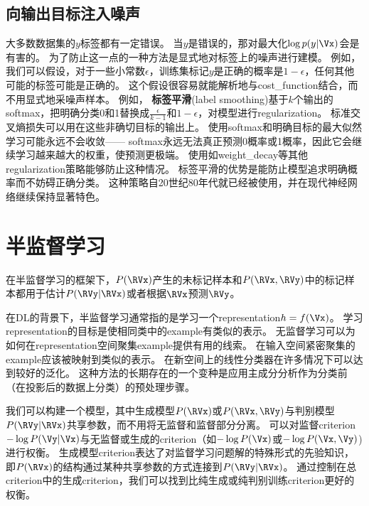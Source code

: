 \subsection{向输出目标注入噪声}
\label{sec:injecting_noise_at_the_output_targets}
大多数数据集的$y$标签都有一定错误。
当$y$是错误的，那对最大化$\log p(y | \Vx)$会是有害的。
为了防止这一点的一种方法是显式地对标签上的噪声进行建模。
例如，我们可以假设，对于一些小常数$\epsilon$，训练集标记$y$是正确的概率是$1-\epsilon$，任何其他可能的标签可能是正确的。
这个假设很容易就能解析地与\gls{cost_function}结合，而不用显式地采噪声样本。
例如， \textbf{标签平滑}(label smoothing)基于$k$个输出的\gls{softmax}，把明确分类0和1替换成$\frac{\epsilon}{k-1}$和$1-\epsilon$，对模型进行\gls{regularization}。
标准交叉熵损失可以用在这些非确切目标的输出上。
使用\gls{softmax}和明确目标的最大似然学习可能永远不会收敛——
\gls{softmax}永远无法真正预测0概率或1概率，因此它会继续学习越来越大的权重，使预测更极端。
使用如\gls{weight_decay}等其他\gls{regularization}策略能够防止这种情况。
标签平滑的优势是能防止模型追求明确概率而不妨碍正确分类。
这种策略自20世纪80年代就已经被使用，并在现代神经网络继续保持显著特色\citep{Szegedy-et-al-2015}。


\section{半监督学习}
\label{sec:semi_supervised_learning}
在半监督学习的框架下，$P(\RVx)$产生的未标记样本和$P(\RVx, \RVy)$中的标记样本都用于估计$P(\RVy | \RVx)$或者根据$\RVx$预测$\RVy$。

在\gls{DL}的背景下，半监督学习通常指的是学习一个\gls{representation}$h = f(\Vx)$。 
学习\gls{representation}的目标是使相同类中的\gls{example}有类似的表示。
无监督学习可以为如何在\gls{representation}空间聚集\gls{example}提供有用的线索。
在输入空间紧密聚集的\gls{example}应该被映射到类似的表示。
在新空间上的线性分类器在许多情况下可以达到较好的泛化\citep{Belkin+Niyogi-2002,Chapelle+al-2003}。
这种方法的长期存在的一个变种是应用主成分分析作为分类前（在投影后的数据上分类）的预处理步骤。

我们可以构建一个模型，其中生成模型$P(\RVx)$或$P(\RVx, \RVy)$与判别模型$P(\RVy | \RVx)$共享参数，而不用将无监督和监督部分分离。
可以对监督\gls{criterion}$-\log P(\Vy | \Vx)$与无监督或生成的\gls{criterion}（如$-\log P(\Vx)$或$-\log P(\Vx, \Vy)$)进行权衡。
生成模型\gls{criterion}表达了对监督学习问题解的特殊形式的先验知识\citep{LasserreJ2006}，即$P(\RVx)$的结构通过某种共享参数的方式连接到$P(\RVy | \RVx)$。
通过控制在总\gls{criterion}中的生成\gls{criterion}，我们可以找到比纯生成或纯判别训练\gls{criterion}更好的权衡\citep{LasserreJ2006,Larochelle2008}。


